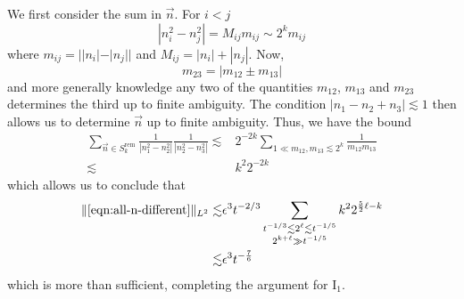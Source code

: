 \documentclass[letterpaper, reqno,final]{amsart}
\newcommand{\rmI}{\mathrm{I}}
\begin{document}
We first consider the sum in $\vec{n}$.  For $i < j$
\begin{equation*}
    |n_i^2 - n_j^2| = M_{ij} m_{ij} \sim 2^k m_{ij}
\end{equation*}
where $m_{ij} = ||n_i| - |n_j||$ and $M_{ij} = |n_i| + |n_j|$.  Now,
\begin{equation*}
    m_{23} = |m_{12} \pm m_{13}|
\end{equation*}
and more generally knowledge any two of the quantities $m_{12}$, $m_{13}$ and $m_{23}$ determines the third up to finite ambiguity.  The condition $|n_1 - n_2 + n_3| \lesssim 1$ then allows us to determine $\vec{n}$ up to finite ambiguity.  Thus, we have the bound
\begin{equation*}\begin{split}
    \sum_{\vec{n} \in S^{\text{rem}}_k} \frac{1}{|n_1^2 - n_2^2|} \frac{1}{|n_2^2 - n_3^2|} \lesssim& 2^{-2k}\sum_{1 \ll m_{12}, m_{13} \lesssim 2^k}  \frac{1}{m_{12}m_{13}}\\
    \lesssim& k^2 2^{-2k}
\end{split}
\end{equation*}
which allows us to conclude that
\begin{equation*}\begin{split}
    \lVert \eqref{eqn:all-n-different} \rVert_{L^2} \lesssim& \epsilon^3 t^{-2/3} \sum_{\substack{t^{-1/3} \lesssim 2^\ell \lesssim t^{-1/5}\\ 2^{k+\ell} \gg t^{-1/5}}} k^2 2^{\frac{5}{2}\ell - k} \\
    \lesssim& \epsilon^3 t^{-\frac{7}{6}}
\end{split}\end{equation*}
which is more than sufficient, completing the argument for $\rmI_1$.
\end{document}
